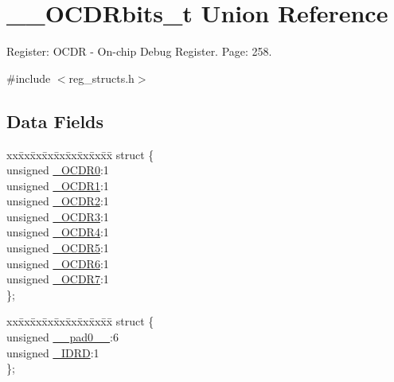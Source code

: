 \hypertarget{union_____o_c_d_rbits__t}{\section{\+\_\+\+\_\+\+O\+C\+D\+Rbits\+\_\+t Union Reference}
\label{union_____o_c_d_rbits__t}
}


Register\+: O\+C\+D\+R -\/ On-\/chip Debug Register. Page\+: 258.  




{\ttfamily \#include $<$reg\+\_\+structs.\+h$>$}

\subsection*{Data Fields}
\begin{DoxyCompactItemize}
\item 
\begin{tabbing}
xx\=xx\=xx\=xx\=xx\=xx\=xx\=xx\=xx\=\kill
struct \{\\
\>unsigned \hyperlink{union_____o_c_d_rbits__t_a83a444463e5696bd01f6e06196136f9c}{\_OCDR0}:1\\
\>unsigned \hyperlink{union_____o_c_d_rbits__t_ab6d5ff0ffcee71db3a14328efe3068da}{\_OCDR1}:1\\
\>unsigned \hyperlink{union_____o_c_d_rbits__t_ad0fb3580034f40ff9813d7ad89250513}{\_OCDR2}:1\\
\>unsigned \hyperlink{union_____o_c_d_rbits__t_a07789d2d37027e228a0e327c26fa47d9}{\_OCDR3}:1\\
\>unsigned \hyperlink{union_____o_c_d_rbits__t_ad5c0c0d822f1ff81cbdead888653269d}{\_OCDR4}:1\\
\>unsigned \hyperlink{union_____o_c_d_rbits__t_acdb9350b4ea420fda0707bb3060a4e5d}{\_OCDR5}:1\\
\>unsigned \hyperlink{union_____o_c_d_rbits__t_a97448a6b5afb44abe78e8fd8d40a17b1}{\_OCDR6}:1\\
\>unsigned \hyperlink{union_____o_c_d_rbits__t_a025b9fbbc0b87781063bc278b5337aca}{\_OCDR7}:1\\
\}; \\

\end{tabbing}\item 
\begin{tabbing}
xx\=xx\=xx\=xx\=xx\=xx\=xx\=xx\=xx\=\kill
struct \{\\
\>unsigned \hyperlink{union_____o_c_d_rbits__t_a1705102b6a99e45807350fa24abf9014}{\_\_pad0\_\_}:6\\
\>unsigned \hyperlink{union_____o_c_d_rbits__t_ae9beda5d199ad64fc1333c6cac66d172}{\_IDRD}:1\\
\}; \\


\end{tabbing}
\end{DoxyCompactItemize}
